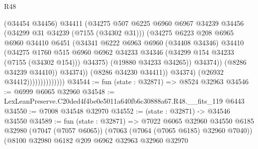 \begin{lexlean}{R48}
\begin{coremodule}
                                        (@34454 @34456)
                                        @34411
                                        (@34275
                                          @507
                                          @6225
                                          @6960
                                          @6967
                                          @34239
                                          @34456
                                          (@34299 @31 @34239 (@7155 (@34302 @31)))
                                          (@34275
                                            @6223
                                            @208
                                            @6965
                                            @6960
                                            @34410
                                            @6451
                                            (@34341
                                              @6222
                                              @6963
                                              @6960
                                              (@34408 @34346)
                                              @34410
                                              (@34275
                                                @1760
                                                @515
                                                @6960
                                                @6962
                                                @34233
                                                @34346
                                                (@34299 @154 @34233 (@7155 (@34302 @154)))
                                                @34375)
                                              (@19880 @34233 @34265))
                                            @34374))
                                        (@8286 @34239 @34410))
                                      @34374))
                                  (@8286 @34230 @34411))
                                @34374)
                              (@26932 @34412))))))))))))))
@34544 := fun (state : @32871) => @8524 @32963
@34546 := @6999 @6065 @32960
@34548 := LexLeanPreserve.C20ded4f4be0e5011a640fb6c30888a67.R48.__fits_119 @6443
@34550 := @7008 @34548 @32970
@34552 := (state : @32871) -> @34546 @34550
@34589 := fun (state : @32871) =>
  @7022
    @6065
    @32960
    @34550
    @6185
    @32980
    (@7047 (@7057 @6065))
    (@7063 (@7064 (@7065 @6185) @32960 @7040))
    (@8100
      @32980
      @6182
      @209
      @6962
      @32963
      @32960
      @32970

\end{coremodule}
\end{lexlean}
